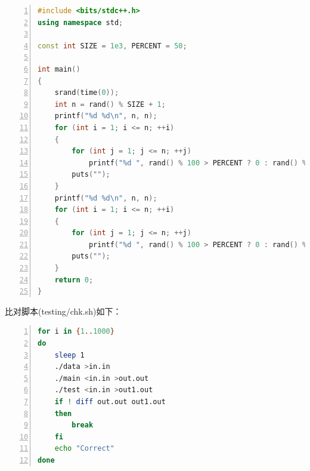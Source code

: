 \documentclass{article}
\begin{document}
\begin{lstlisting}[language={C++},
    numbers=left,
    numberstyle=\tiny\consolas,
    basicstyle=\small\consolas]
#include <bits/stdc++.h>
using namespace std;

const int SIZE = 1e3, PERCENT = 50;

int main()
{
    srand(time(0));
    int n = rand() % SIZE + 1;
    printf("%d %d\n", n, n);
    for (int i = 1; i <= n; ++i)
    {
        for (int j = 1; j <= n; ++j)
            printf("%d ", rand() % 100 > PERCENT ? 0 : rand() % 1000 + 1);
        puts("");
    }
    printf("%d %d\n", n, n);
    for (int i = 1; i <= n; ++i)
    {
        for (int j = 1; j <= n; ++j)
            printf("%d ", rand() % 100 > PERCENT ? 0 : rand() % 1000 + 1);
        puts("");
    }
    return 0;
}
\end{lstlisting}

比对脚本(testing/chk.sh)如下：

\begin{lstlisting}[language={bash},
    numbers=left,
    numberstyle=\tiny\consolas,
    basicstyle=\small\consolas]
for i in {1..1000}
do
    sleep 1
    ./data >in.in
    ./main <in.in >out.out
    ./test <in.in >out1.out
    if ! diff out.out out1.out
    then
        break
    fi
    echo "Correct"
done
\end{lstlisting}
\end{document}
